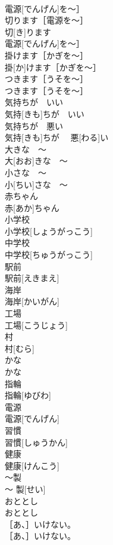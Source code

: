 \documentclass[8pt]{extreport}
\begin{document}
\begin{CJK}{UTF8}{min}
\\	電源[でんげん]を〜］	
\\	切ります［電源を〜］	
\\	切[き]ります
\\	電源[でんげん]を〜］	
\\	掛けます［かぎを〜］	
\\	掛[か]けます［かぎを〜］	
\\	つきます［うそを〜］	
\\	つきます［うそを〜］	
\\	気持ちが　いい	
\\	気持[きも]ちが　いい	
\\	気持ちが　悪い	
\\	気持[きも]ちが　 悪[わる]い	
\\	大きな　〜	
\\	大[おお]きな　〜	
\\	小さな　〜	
\\	小[ちい]さな　〜	
\\	赤ちゃん	
\\	赤[あか]ちゃん	
\\	小学校	
\\	小学校[しょうがっこう]	
\\	中学校	
\\	中学校[ちゅうがっこう]	
\\	駅前	
\\	駅前[えきまえ]	
\\	海岸	
\\	海岸[かいがん]	
\\	工場	
\\	工場[こうじょう]	
\\	村	
\\	村[むら]	
\\	かな	
\\	かな	
\\	指輪	
\\	指輪[ゆびわ]	
\\	電源	
\\	電源[でんげん]	
\\	習慣	
\\	習慣[しゅうかん]	
\\	健康	
\\	健康[けんこう]	
\\	〜製	
\\	〜 製[せい]	
\\	おととし	
\\	おととし	
\\	［あ、］いけない。	
\\	［あ、］いけない。	

\end{CJK}
\end{document}
